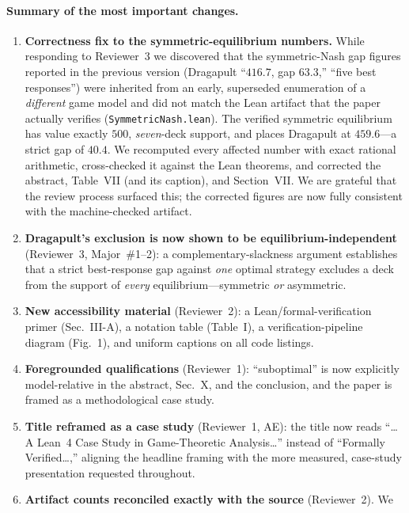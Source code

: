 \documentclass[11pt]{article}
\begin{document}
\paragraph{Summary of the most important changes.}
\begin{enumerate}[leftmargin=1.4em]
\item \textbf{Correctness fix to the symmetric-equilibrium numbers.} While
  responding to Reviewer~3 we discovered that the symmetric-Nash gap figures
  reported in the previous version (Dragapult ``$416.7$\textperthousand, gap
  $63.3$,'' ``five best responses'') were inherited from an early, superseded
  enumeration of a \emph{different} game model and did not match the Lean
  artifact that the paper actually verifies (\texttt{SymmetricNash.lean}). The
  verified symmetric equilibrium has value exactly $500$, \emph{seven}-deck
  support, and places Dragapult at $459.6$\textperthousand---a strict gap of
  $\mathbf{40.4}$\textperthousand. We recomputed every affected number with exact
  rational arithmetic, cross-checked it against the Lean theorems, and corrected
  the abstract, Table~VII (and its caption), and Section~VII. We are grateful
  that the review process surfaced this; the corrected figures are now fully
  consistent with the machine-checked artifact.
\item \textbf{Dragapult's exclusion is now shown to be equilibrium-independent}
  (Reviewer~3, Major~\#1--2): a complementary-slackness argument establishes that
  a strict best-response gap against \emph{one} optimal strategy excludes a deck
  from the support of \emph{every} equilibrium---symmetric \emph{or} asymmetric.
\item \textbf{New accessibility material} (Reviewer~2): a Lean/formal-verification
  primer (Sec.~III-A), a notation table (Table~I), a verification-pipeline diagram
  (Fig.~1), and uniform captions on all code listings.
\item \textbf{Foregrounded qualifications} (Reviewer~1): ``suboptimal'' is now
  explicitly model-relative in the abstract, Sec.~X, and the conclusion, and the
  paper is framed as a methodological case study.
\item \textbf{Title reframed as a case study} (Reviewer~1, AE): the title now reads
  ``\ldots A Lean~4 Case Study in Game-Theoretic Analysis\ldots'' instead of
  ``Formally Verified\ldots,'' aligning the headline framing with the more measured,
  case-study presentation requested throughout.
\item \textbf{Artifact counts reconciled exactly with the source} (Reviewer~2). We

\end{enumerate}
\end{document}
